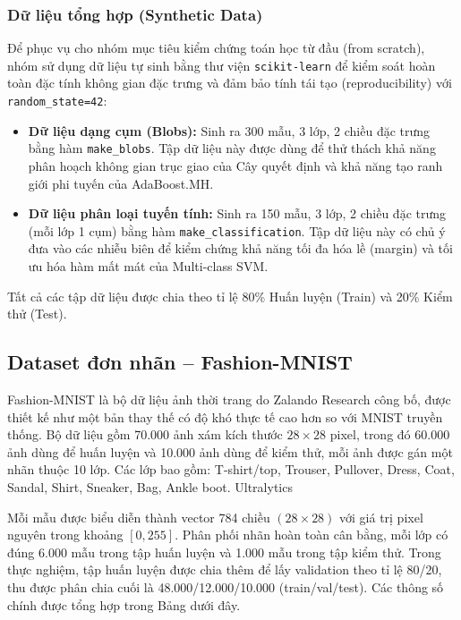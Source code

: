 \subsubsection{Dữ liệu tổng hợp (Synthetic Data)}
\label{sssec:synthetic_data}
Để phục vụ cho nhóm mục tiêu kiểm chứng toán học từ đầu (from scratch), nhóm sử dụng dữ liệu tự sinh bằng thư viện \texttt{scikit-learn} \cite{sklearn} để kiểm soát hoàn toàn đặc tính không gian đặc trưng và đảm bảo tính tái tạo (reproducibility) với \texttt{random\_state=42}:
\begin{itemize}[leftmargin=2em]
    \item \textbf{Dữ liệu dạng cụm (Blobs):} Sinh ra 300 mẫu, 3 lớp, 2 chiều đặc trưng bằng hàm \texttt{make\_blobs}. Tập dữ liệu này được dùng để thử thách khả năng phân hoạch không gian trục giao của Cây quyết định và khả năng tạo ranh giới phi tuyến của AdaBoost.MH.
    \item \textbf{Dữ liệu phân loại tuyến tính:} Sinh ra 150 mẫu, 3 lớp, 2 chiều đặc trưng (mỗi lớp 1 cụm) bằng hàm \texttt{make\_classification}. Tập dữ liệu này có chủ ý đưa vào các nhiễu biên để kiểm chứng khả năng tối đa hóa lề (margin) và tối ưu hóa hàm mất mát của Multi-class SVM.
\end{itemize}
Tất cả các tập dữ liệu được chia theo tỉ lệ 80\% Huấn luyện (Train) và 20\% Kiểm thử (Test).

\subsection{Dataset đơn nhãn -- Fashion-MNIST}

Fashion-MNIST là bộ dữ liệu ảnh thời trang do Zalando Research công bố, được thiết kế như một bản thay thế có độ khó thực tế cao hơn so với MNIST truyền thống. Bộ dữ liệu gồm 70.000 ảnh xám kích thước $28 \times 28$ pixel, trong đó 60.000 ảnh dùng để huấn luyện và 10.000 ảnh dùng để kiểm thử, mỗi ảnh được gán một nhãn thuộc 10 lớp. Các lớp bao gồm: T-shirt/top, Trouser, Pullover, Dress, Coat, Sandal, Shirt, Sneaker, Bag, Ankle boot. Ultralytics

Mỗi mẫu được biểu diễn thành vector 784 chiều $(28 \times 28)$ với giá trị pixel nguyên trong khoảng $[0,255]$. Phân phối nhãn hoàn toàn cân bằng, mỗi lớp có đúng 6.000 mẫu trong tập huấn luyện và 1.000 mẫu trong tập kiểm thử. Trong thực nghiệm, tập huấn luyện được chia thêm để lấy validation theo tỉ lệ 80/20, thu được phân chia cuối là 48.000/12.000/10.000 (train/val/test). Các thông số chính được tổng hợp trong Bảng dưới đây.

